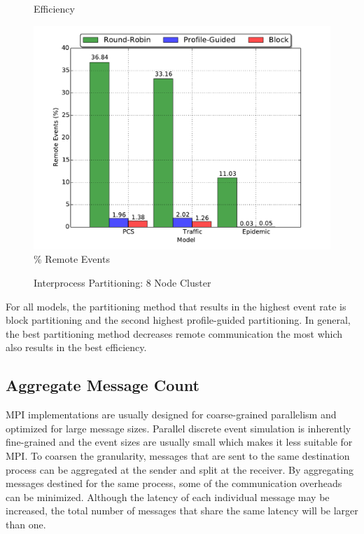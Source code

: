 \documentclass[11pt]{book}
\begin{document}
\begin{figure}
\begin{minipage}{.5\textwidth}
\begin{center}
      Efficiency \\
    \end{center}
  \end{minipage}
  \centering
  \begin{minipage}{.5\textwidth}
    \begin{center}
      \includegraphics[width=\textwidth,keepaspectratio,quiet]{figs/partitioning_communication/partitioning_premote_8node.pdf} \\
      \% Remote Events \\
    \end{center}
  \end{minipage}
  \caption{Interprocess Partitioning: 8 Node Cluster}\label{partitioning_8node}
\end{figure}

For all models, the partitioning method that results in the highest event rate is block partitioning
and the second highest profile-guided partitioning.  In general, the best partitioning method
decreases remote communication the most which also results in the best efficiency.

\subsection{Aggregate Message Count}

MPI implementations are usually designed for coarse-grained parallelism and optimized for large
message sizes.  Parallel discrete event simulation is inherently fine-grained and the event sizes
are usually small which makes it less suitable for MPI.  To coarsen the granularity, messages that
are sent to the same destination process can be aggregated at the sender and split at the receiver.
By aggregating messages destined for the same process, some of the communication overheads can be
minimized.  Although the latency of each individual message may be increased, the total number of
messages that share the same latency will be larger than one.
\end{document}
